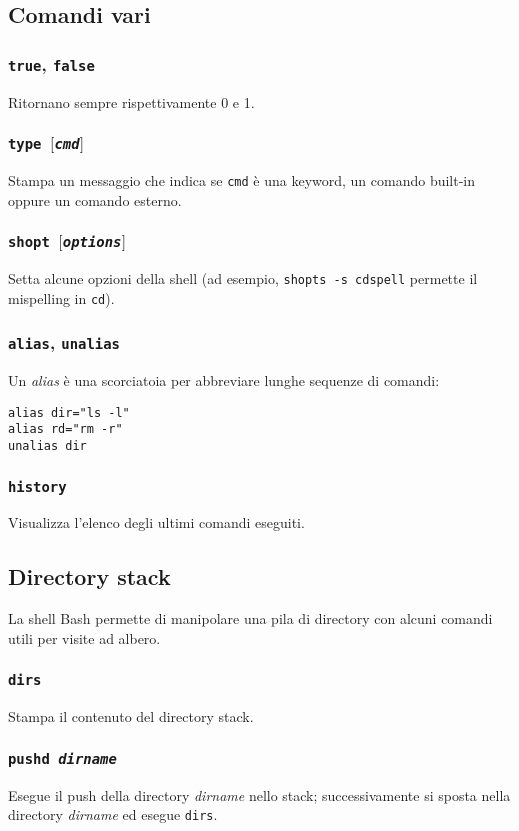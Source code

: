 \subsection{Comandi vari}
\subsubsection*{\texttt{true}, \texttt{false}}
Ritornano sempre rispettivamente 0 e 1.

\subsubsection*{\texttt{type $[$\emph{cmd}$]$}}
Stampa un messaggio che indica se \texttt{cmd} \`e una keyword, un comando
built-in oppure un comando esterno.

\subsubsection*{\texttt{shopt $[$\emph{options}$]$}}
Setta alcune opzioni della shell (ad esempio, \texttt{shopts -s cdspell}
permette il mispelling in \texttt{cd}).

\subsubsection*{\texttt{alias}, \texttt{unalias}}
Un \emph{alias} \`e una scorciatoia per abbreviare lunghe sequenze di comandi:
\begin{verbatim}
alias dir="ls -l"
alias rd="rm -r"
unalias dir
\end{verbatim}

\subsubsection*{\texttt{history}}
Visualizza l'elenco degli ultimi comandi eseguiti.

\subsection{Directory stack}
La shell Bash permette di manipolare una pila di directory con alcuni comandi
utili per visite ad albero.

\subsubsection*{\texttt{dirs}}
Stampa il contenuto del directory stack.

\subsubsection*{\texttt{pushd \emph{dirname}}}
Esegue il push della directory \emph{dirname} nello stack; successivamente si
sposta nella directory \emph{dirname} ed esegue \texttt{dirs}.

